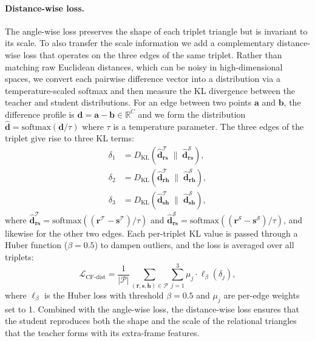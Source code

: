 \paragraph{Distance-wise loss.}
The angle-wise loss preserves the shape of each triplet triangle but is invariant to its scale. To also transfer the scale information we add a complementary distance-wise loss that operates on the three edges of the same triplet. Rather than matching raw Euclidean distances, which can be noisy in high-dimensional spaces, we convert each pairwise difference vector into a distribution via a temperature-scaled softmax and then measure the KL divergence between the teacher and student distributions. For an edge between two points $\mathbf{a}$ and $\mathbf{b}$, the difference profile is $\mathbf{d} = \mathbf{a} - \mathbf{b} \in \mathbb{R}^{C}$ and we form the distribution $\hat{\mathbf{d}} = \text{softmax}(\mathbf{d}/\tau)$ where $\tau$ is a temperature parameter. The three edges of the triplet give rise to three KL terms:
\begin{align}
\delta_1 &= D_{\text{KL}}\!\left(\hat{\mathbf{d}}^{\mathcal{T}}_{\mathbf{r}\mathbf{s}} \;\|\; \hat{\mathbf{d}}^{\mathcal{S}}_{\mathbf{r}\mathbf{s}}\right), \label{eq:dist_d1} \\
\delta_2 &= D_{\text{KL}}\!\left(\hat{\mathbf{d}}^{\mathcal{T}}_{\mathbf{r}\mathbf{h}} \;\|\; \hat{\mathbf{d}}^{\mathcal{S}}_{\mathbf{r}\mathbf{h}}\right), \label{eq:dist_d2} \\
\delta_3 &= D_{\text{KL}}\!\left(\hat{\mathbf{d}}^{\mathcal{T}}_{\mathbf{s}\mathbf{h}} \;\|\; \hat{\mathbf{d}}^{\mathcal{S}}_{\mathbf{s}\mathbf{h}}\right), \label{eq:dist_d3}
\end{align}
where $\hat{\mathbf{d}}^{\mathcal{T}}_{\mathbf{r}\mathbf{s}} = \text{softmax}((\mathbf{r}^{\mathcal{T}} - \mathbf{s}^{\mathcal{T}})/\tau)$ and $\hat{\mathbf{d}}^{\mathcal{S}}_{\mathbf{r}\mathbf{s}} = \text{softmax}((\mathbf{r}^{\mathcal{S}} - \mathbf{s}^{\mathcal{S}})/\tau)$, and likewise for the other two edges. Each per-triplet KL value is passed through a Huber function ($\beta = 0.5$) to dampen outliers, and the loss is averaged over all triplets:
\begin{equation}
\mathcal{L}_{\text{CF-dist}} = \frac{1}{|\mathcal{P}|} \sum_{(\mathbf{r}, \mathbf{s}, \mathbf{h}) \in \mathcal{P}} \sum_{j=1}^{3} \mu_j \cdot \ell_{\beta}(\delta_j),
\label{eq:cf_dist_loss}
\end{equation}
where $\ell_{\beta}$ is the Huber loss with threshold $\beta = 0.5$ and $\mu_j$ are per-edge weights set to 1. Combined with the angle-wise loss, the distance-wise loss ensures that the student reproduces both the shape and the scale of the relational triangles that the teacher forms with its extra-frame features.

